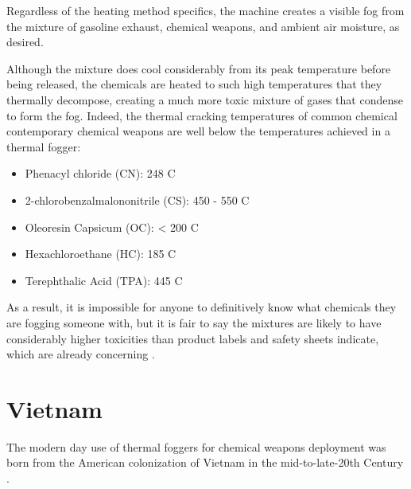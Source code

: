 \documentclass[
  11pt,
]{krantz}
\providecommand{\tightlist}{%
  \setlength{\itemsep}{0pt}\setlength{\parskip}{0pt}}
\begin{document}
Regardless of the heating method specifics, the machine creates a visible fog from the mixture of gasoline exhaust, chemical weapons, and ambient air moisture, as desired.

Although the mixture does cool considerably from its peak temperature before being released, the chemicals are heated to such high temperatures that they thermally decompose, creating a much more toxic mixture of gases that condense to form the fog.
Indeed, the thermal cracking temperatures of common chemical contemporary chemical weapons are well below the temperatures achieved in a thermal fogger:

\begin{itemize}
\tightlist
\item
  Phenacyl chloride (CN): 248 C \citep{Compton1987}
\item
  2-chlorobenzalmalononitrile (CS): 450 - 550 C \citep{Xueetal2015}
\item
  Oleoresin Capsicum (OC): \textless{} 200 C \citep{HendersonandHenderson1992}
\item
  Hexachloroethane (HC): 185 C \citep{IARC1979}
\item
  Terephthalic Acid (TPA): 445 C \citep{KimyonokandUluturk2016}
\end{itemize}

As a result, it is impossible for anyone to definitively know what chemicals they are fogging someone with, but it is fair to say the mixtures are likely to have considerably higher toxicities than product labels and safety sheets indicate, which are already concerning \citep{defteccs}.

\hypertarget{Vietnam}{%
\chapter*{Vietnam}\label{Vietnam}}


The modern day use of thermal foggers for chemical weapons deployment was born from the American colonization of Vietnam in the mid-to-late-20th Century \citep{USMACV1965, Bunker1996}.
\end{document}
